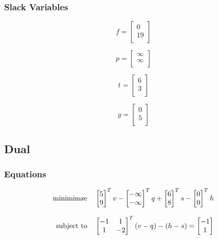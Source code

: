 \documentclass[14pt]{extarticle}
\begin{document}
\subsubsection*{Slack Variables}
\[f = \begin{bmatrix}
    0 \\
    19 \\
\end{bmatrix}\]

\[p = \begin{bmatrix}
    \infty \\
    \infty \\
\end{bmatrix}\]

\[t = \begin{bmatrix}
    6 \\
    3 \\
\end{bmatrix}\]

\[g = \begin{bmatrix}
    0 \\
    5 \\
\end{bmatrix}\]

\subsection*{Dual}
\subsubsection*{Equations}
\[\begin{tabular}{r l}
    minimimze & $\begin{bmatrix}
        5 \\
        9 \\
    \end{bmatrix}^Tv
    - \begin{bmatrix}
        -\infty \\
        -\infty \\
    \end{bmatrix}^Tq
    + \begin{bmatrix}
        6 \\
        8 \\
    \end{bmatrix}^Ts
    - \begin{bmatrix}
        0 \\
        0 \\
    \end{bmatrix}^Th$ \\
    \\
    subject to & $\begin{bmatrix}
        -1 & 1 \\
        1 & -2 \\
    \end{bmatrix}^T(v-q)-(h-s)=\begin{bmatrix}
        -1 \\
        1 \\
    \end{bmatrix}$
\end{tabular}\]
\end{document}
